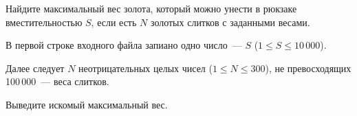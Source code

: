 

Найдите максимальный вес золота, который можно унести в рюкзаке вместительностью $S$, если есть $N$ золотых слитков с заданными весами.



\InputFile
В первой строке входного файла запиано одно число~--- $S$ ($1 \leqslant S \leqslant 10\,000$). 

Далее следует $N$ неотрицательных целых чисел ($1 \leqslant N \leqslant 300$), не превосходящих 100\,000~--- веса слитков.

\OutputFile
Выведите искомый максимальный вес.

